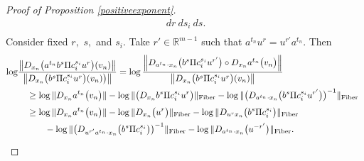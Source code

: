 \documentclass[10pt,reqno]{amsart}
\theoremstyle{Theorem}
\theoremstyle{definition}
\theoremstyle{remark}
\newcommand{\note}[1]{\marginpar{{\color{red}\footnotesize \begin{spacing}{1}#1\end{spacing}}}}
\newcommand{\R}{\mathbb {R}}
\def\red{\color{red}}
\def\blue{}
\begin{document}
{\begin{proof}[Proof of Proposition \ref{positiveexponent}]
\begin{equation*}
\begin{aligned}
\  dr \ ds_i \ d s.\\
 \end{aligned}
 \end{equation*}
Consider fixed $r,$ $s, $ and $ s_i$.  Take $r'\in \R^{m-1}$ such that $a^{t_n} u^r = u^{r'}a^{t_n} $.  Then
 \begin{equation*}  \begin{aligned}
 \log &\frac{\left \| D_{ x_n  } \big( a^{t_n} b^s\Pi  c_i^{s_i}u^r\big) ( v_n) \right  \|    }{\left \| D_{ x_n  } \big(   b^s\Pi  c_i^{s_i}u^r\big) ( v_n)\big) \right  \|  }
  =  \log \frac{\left \| D_{ a^{t_n}\cdot x_n  } \big( b^s\Pi  c_i^{s_i} u^{r'}   \big)       \circ  D_{ x_n  } a^{t_n}   \big( v_n\big) \right  \|    }{\left \| D_{ x_n  } \big(   b^s\Pi  c_i^{s_i}u^r\big) ( v_n) \right  \|  }\\
 &\quad \ge \log \|D_{ x_n  } a^{t_n}   \big( v_n\big)\| -   \log \| \big (D_{ x_n  }   b^s\Pi  c_i^{s_i}u^r\big) \| _\fib- \log \| \big( D_{ a^{t_n}\cdot x_n  } \big( b^s\Pi  c_i^{s_i} u^{r'} \big)\big)^{\blue -1} \|_\fib \phantom{\Big\|}\\
%
 &\quad \ge \log \|D_{ x_n  } a^{t_n}   \big( v_n\big)\| -   \log \| D_{ x_n  } \big(    u^r\big)\| _\fib- \log \| D_{ u^r x_n  } \big(   b^s\Pi  c_i^{s_i} \big)\|_\fib
 \\&\quad \quad \quad  - \log \| \big (D_{ u^{r'}a^{t_n}\cdot x_n  } \big( b^s\Pi  c_i^{s_i}   \big) \big)^{\blue -1}\|_\fib -
 \log \| D_{ a^{t_n}\cdot x_n  } \big(  u^{{\blue -r'}}  \big)\|_\fib
 . \phantom{\Big\|}\\
%
 \end{aligned}
 \end{equation*}%







\end{proof}}
\end{document}
